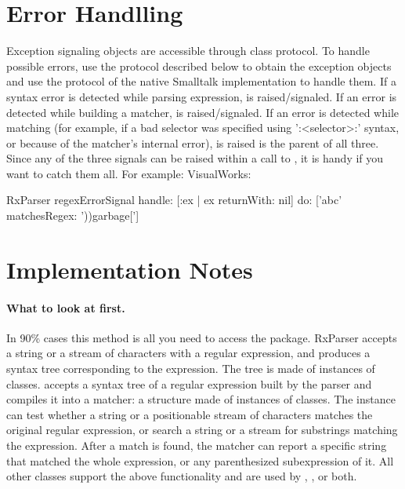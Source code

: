 \documentclass[a4paper,10pt,twoside]{book}
\begin{document}
{
	
\section{Error Handlling}		
Exception signaling objects are accessible through  class protocol. To handle possible errors, use the protocol described below to obtain the exception objects and use the protocol of the native Smalltalk implementation to handle them. If a syntax error is detected while parsing expression,  is raised/signaled. If an error is detected while building a matcher,  is raised/signaled. If an error is detected while matching (for example, if a bad selector was specified using ':<selector>:' syntax, or because of the matcher's internal error),  is raised  is the parent of all three.  Since any of the three signals can be raised within a call to , it is handy if you want to catch them all.  For example: VisualWorks: 	

\begin{code}{}
RxParser regexErrorSignal 
   handle: [:ex | ex returnWith: nil]
   do: ['abc' matchesRegex: '))garbage['] 
\end{code}



\section{Implementation Notes}

\paragraph{What to look at first.} In 90\% cases this method   is all you need to access the package. RxParser accepts a string or a stream of characters with a regular expression, and produces a syntax tree corresponding to the expression. The tree is made of instances of  classes.   accepts a syntax tree of a regular expression built by the parser and compiles it into a matcher: a structure made of instances of  classes. The  instance can test whether a string or a positionable stream of characters matches the original regular expression, or search a string or a stream for substrings matching the expression. After a match is found, the matcher can report a specific string that matched the whole expression, or any parenthesized subexpression of it. All other classes support the above functionality and are used by , , or both. 	

}
\end{document}
